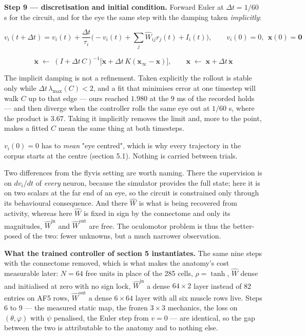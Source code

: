 \documentclass[10pt]{article}
\begin{document}
\textbf{Step 9 --- discretisation and initial condition.} Forward Euler at $\Delta t = 1/60$
s for the circuit, and for the eye the same step with the damping taken \emph{implicitly}:

\begin{equation}
\label{eq:euler-circuit}
v_i(t{+}\Delta t) = v_i(t) + \frac{\Delta t}{\tau_i}
\Big(-v_i(t) + \textstyle\sum_j \hat W_{ij} r_j(t) + I_i(t)\Big),
\qquad v_i(0)=0,\ \ \mathbf{x}(0)=\mathbf{0}
\end{equation}

\begin{equation}
\label{eq:euler-eye}
\dot{\mathbf{x}}\;\leftarrow\;(I+\Delta t\,C)^{-1}
\big[\dot{\mathbf{x}} + \Delta t\,K(\mathbf{x}_{\infty}-\mathbf{x})\big],
\qquad
\mathbf{x}\;\leftarrow\;\mathbf{x}+\Delta t\,\dot{\mathbf{x}}
\end{equation}

The implicit damping is not a refinement. Taken explicitly the rollout is stable only while
$\Delta t\,\lambda_{\max}(C) < 2$, and a fit that minimises error at one timestep will walk
$C$ up to that edge --- ours reached $1.980$ at the $9$ ms of the recorded holds --- and
then diverge when the controller rolls the same eye out at $1/60$ s, where the product is
$3.67$. Taking it implicitly removes the limit and, more to the point, makes a fitted $C$
mean the same thing at both timesteps.

$v_i(0)=0$ has to \emph{mean} "eye centred", which is why every trajectory in the corpus
starts at the centre (section 5.1). Nothing is carried between trials.

Two differences from the flyvis setting are worth naming. There the supervision is on
$dv_i/dt$ of \emph{every} neuron, because the simulator provides the full state; here it is
on two scalars at the far end of an eye, so the circuit is constrained only through its
behavioural consequence. And there $\hat{W}$ is what is being recovered from activity,
whereas here $\hat{W}$ is fixed in sign by the connectome and only its magnitudes, $\hat
W^{\mathrm{in}}$ and $\hat W^{\mathrm{out}}$ are free. The oculomotor problem is thus the
better-posed of the two: fewer unknowns, but a much narrower observation.

\textbf{What the trained controller of section 5 instantiates.} The same nine steps with the
connectome removed, which is what makes the anatomy's cost measurable later: $N=64$ free
units in place of the 285 cells, $\rho=\tanh$, $\hat W$ dense and initialised at zero with
no sign lock, $\hat W^{\mathrm{in}}$ a dense $64\times2$ layer instead of 82 entries on AF5
rows, $\hat W^{\mathrm{out}}$ a dense $6\times64$ layer with all six muscle rows live. Steps
6 to 9 --- the measured static map, the frozen $3\times3$ mechanics, the loss on
$(\theta,\varphi)$ with $\psi$ penalised, the Euler step from $v=0$ --- are identical, so
the gap between the two is attributable to the anatomy and to nothing else.
\end{document}
